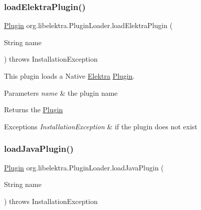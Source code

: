 \subsubsection{\texorpdfstring{load\+Elektra\+Plugin()}{loadElektraPlugin()}}
{\footnotesize\ttfamily \hyperlink{interfaceorg_1_1libelektra_1_1Plugin}{Plugin} org.\+libelektra.\+Plugin\+Loader.\+load\+Elektra\+Plugin (\begin{DoxyParamCaption}\item[{String}]{name }\end{DoxyParamCaption}) throws Installation\+Exception\hspace{0.3cm}{\ttfamily [inline]}}



This plugin loads a Native \hyperlink{interfaceorg_1_1libelektra_1_1Elektra}{Elektra} \hyperlink{interfaceorg_1_1libelektra_1_1Plugin}{Plugin}. 


\begin{DoxyParams}{Parameters}
{\em name} & the plugin name \\
\hline
\end{DoxyParams}
\begin{DoxyReturn}{Returns}
the \hyperlink{interfaceorg_1_1libelektra_1_1Plugin}{Plugin} 
\end{DoxyReturn}

\begin{DoxyExceptions}{Exceptions}
{\em Installation\+Exception} & if the plugin does not exist \\
\hline
\end{DoxyExceptions}
\mbox{\label{classorg_1_1libelektra_1_1PluginLoader_af0eac085b1b966aaabfda24ad0836f43}} 
\subsubsection{\texorpdfstring{load\+Java\+Plugin()}{loadJavaPlugin()}}
{\footnotesize\ttfamily \hyperlink{interfaceorg_1_1libelektra_1_1Plugin}{Plugin} org.\+libelektra.\+Plugin\+Loader.\+load\+Java\+Plugin (\begin{DoxyParamCaption}\item[{String}]{name }\end{DoxyParamCaption}) throws Installation\+Exception\hspace{0.3cm}{\ttfamily [inline]}}



